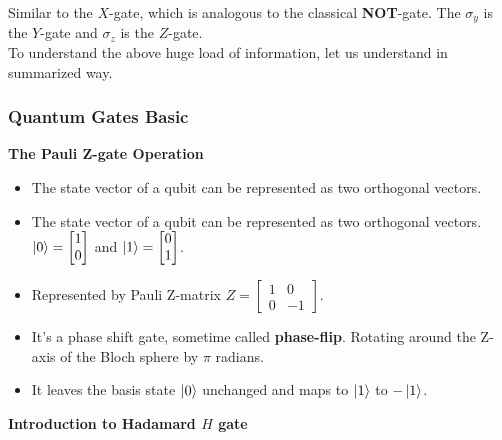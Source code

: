 \documentclass{article}
\begin{document}
Similar to the $X$-gate, which is analogous to the classical \textbf{NOT}-gate. The $\sigma_{y}$ is the $Y$-gate and $\sigma_{z}$ is the $Z$-gate.\\
To understand the above huge load of information, let us understand in summarized way.
\newpage
\subsubsection{Quantum Gates Basic}
\label{subsubsec: Quantum Gates Basic}
\textbf{The Pauli Z-gate Operation}
\begin{itemize}
    \item The state vector of a qubit can be represented as two orthogonal vectors.
    \item The state vector of a qubit can be represented as two orthogonal vectors. 
$\ket{0} = \begin{bmatrix} 1 \\ 0\end{bmatrix}$ and 
$\ket{1} = \begin{bmatrix} 0 \\ 1 \end{bmatrix}$.
    \item  Represented by Pauli Z-matrix 
$Z = \begin{bmatrix} 1 & 0 \\ 0 & -1 \end{bmatrix}$.
    \item  It's a phase shift gate, sometime called \textbf{phase-flip}. Rotating around the Z-axis of the Bloch sphere by $\pi$ radians.
    \item It leaves the basis state $\ket{0}$ unchanged and maps to $\ket{1}$ to $-\ket{1}$.
\end{itemize}
\textbf{Introduction to Hadamard $H$ gate}
\end{document}
